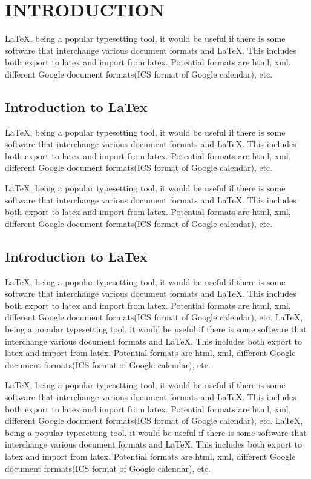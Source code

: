 \documentclass[a4paper,10pt]{mesreport}
\begin{document}
\newpage

\chapter{INTRODUCTION}
LaTeX, being a popular typesetting tool, it would be useful if there is some software that interchange
various document formats and LaTeX. This includes both export to latex and import from latex.
Potential formats are html, xml, different Google document formats(ICS format of Google calendar), etc.
\section{Introduction to LaTex}
LaTeX, being a popular typesetting tool, it would be useful if there is some software that interchange
various document formats and LaTeX. This includes both export to latex and import from latex.
Potential formats are html, xml, different Google document formats(ICS format of Google calendar), etc.

LaTeX, being a popular typesetting tool, it would be useful if there is some software that interchange
various document formats and LaTeX. This includes both export to latex and import from latex.
Potential formats are html, xml, different Google document formats(ICS format of Google calendar), etc.

\section{Introduction to LaTex}
LaTeX, being a popular typesetting tool, it would be useful if there is some software that interchange
various document formats and LaTeX. This includes both export to latex and import from latex.
Potential formats are html, xml, different Google document formats(ICS format of Google calendar), etc.
LaTeX, being a popular typesetting tool, it would be useful if there is some software that interchange
various document formats and LaTeX. This includes both export to latex and import from latex.
Potential formats are html, xml, different Google document formats(ICS format of Google calendar), etc.

LaTeX, being a popular typesetting tool, it would be useful if there is some software that interchange
various document formats and LaTeX. This includes both export to latex and import from latex.
Potential formats are html, xml, different Google document formats(ICS format of Google calendar), etc.
LaTeX, being a popular typesetting tool, it would be useful if there is some software that interchange
various document formats and LaTeX. This includes both export to latex and import from latex.
Potential formats are html, xml, different Google document formats(ICS format of Google calendar), etc.
\end{document}
